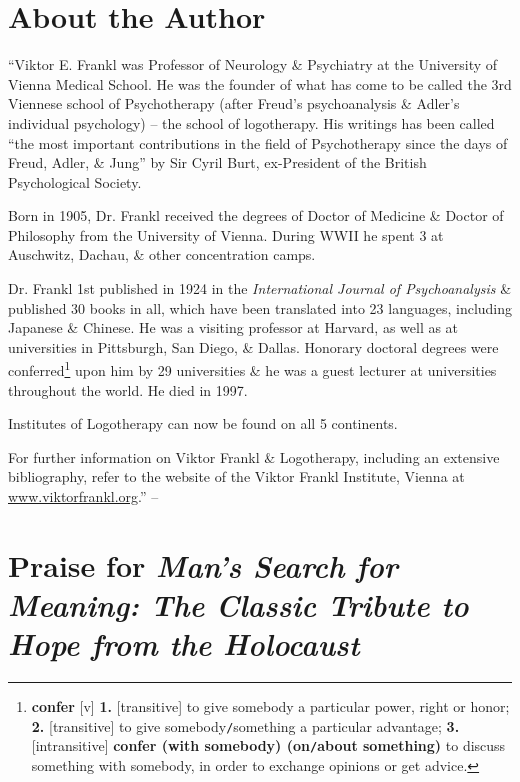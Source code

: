 \documentclass[oneside]{book}
\numberwithin{equation}{section}
\begin{document}
\section*{About the Author}
``Viktor E. Frankl was Professor of Neurology \& Psychiatry at the University of Vienna Medical School. He was the founder of what has come to be called the 3rd Viennese school of Psychotherapy (after Freud's psychoanalysis \& Adler's individual psychology) -- the school of logotherapy. His writings has been called ``the most important contributions in the field of Psychotherapy since the days of Freud, Adler, \& Jung'' by Sir Cyril Burt, ex-President of the British Psychological Society.

Born in 1905, Dr. Frankl received the degrees of Doctor of Medicine \& Doctor of Philosophy from the University of Vienna. During WWII he spent 3 at Auschwitz, Dachau, \& other concentration camps.

Dr. Frankl 1st published in 1924 in the \textit{International Journal of Psychoanalysis} \& published 30 books in all, which have been translated into 23 languages, including Japanese \& Chinese. He was a visiting professor at Harvard, as well as at  universities in Pittsburgh, San Diego, \& Dallas. Honorary doctoral degrees were conferred\footnote{\textbf{confer} [v] \textbf{1.} [transitive] to give somebody a particular power, right or honor; \textbf{2.} [transitive] to give somebody\texttt{/}something a particular advantage; \textbf{3.} [intransitive] \textbf{confer (with somebody) (on\texttt{/}about something)} to discuss something with somebody, in order to exchange opinions or get advice.} upon him by 29 universities \& he was a guest lecturer at universities throughout the world. He died in 1997.

Institutes of Logotherapy can now be found on all 5 continents.

For further information on Viktor Frankl \& Logotherapy, including an extensive bibliography, refer to the website of the Viktor Frankl Institute, Vienna at \url{www.viktorfrankl.org}.'' -- \cite[p. 4]{Frankl2013}


\section*{Praise for \textit{Man's Search for Meaning: The Classic Tribute to Hope from the Holocaust}}
\end{document}
